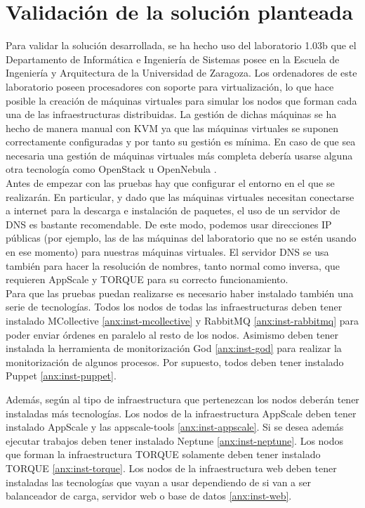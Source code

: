 \chapter{Validación de la solución planteada}
\label{cap:validacion}


Para validar la solución desarrollada, se ha hecho uso del laboratorio 1.03b que el Departamento de Informática e Ingeniería de Sistemas posee en la Escuela de Ingeniería y Arquitectura de la Universidad de Zaragoza. Los ordenadores de este laboratorio poseen procesadores con soporte para virtualización, lo que hace posible la creación de máquinas virtuales para simular los nodos que forman cada una de las infraestructuras distribuidas. La gestión de dichas máquinas se ha hecho de manera manual con KVM ya que las máquinas virtuales se suponen correctamente configuradas y por tanto su gestión es mínima. En caso de que sea necesaria una gestión de máquinas virtuales más completa debería usarse alguna otra tecnología como OpenStack \cite{openstack} u OpenNebula \cite{opennebula}. \\

Antes de empezar con las pruebas hay que configurar el entorno en el que se realizarán. En particular, y dado que las máquinas virtuales necesitan conectarse a internet para la descarga e instalación de paquetes, el uso de un servidor de DNS es bastante recomendable. De este modo, podemos usar direcciones IP públicas (por ejemplo, las de las máquinas del laboratorio que no se estén usando en ese momento) para nuestras máquinas virtuales. El servidor DNS se usa también para hacer la resolución de nombres, tanto normal como inversa, que requieren AppScale y TORQUE para su correcto funcionamiento. \\

Para que las pruebas puedan realizarse es necesario haber instalado también una serie de tecnologías. Todos los nodos de todas las infraestructuras deben tener instalado MCollective \ref{anx:inst-mcollective} y RabbitMQ \ref{anx:inst-rabbitmq} para poder enviar órdenes en paralelo al resto de los nodos. Asimismo deben tener instalada la herramienta de monitorización God \ref{anx:inst-god} para realizar la monitorización de algunos procesos. Por supuesto, todos deben tener instalado Puppet \ref{anx:inst-puppet}.

Además, según al tipo de infraestructura que pertenezcan los nodos deberán tener instaladas más tecnologías. Los nodos de la infraestructura AppScale deben tener instalado AppScale y las appscale-tools \ref{anx:inst-appscale}. Si se desea además ejecutar trabajos deben tener instalado Neptune \ref {anx:inst-neptune}. Los nodos que forman la infraestructura TORQUE solamente deben tener instalado TORQUE \ref{anx:inst-torque}. Los nodos de la infraestructura web deben tener instaladas las tecnologías que vayan a usar dependiendo de si van a ser balanceador de carga, servidor web o base de datos \ref{anx:inst-web}.


